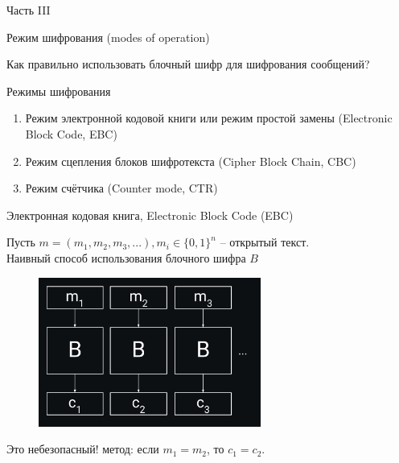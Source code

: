 \documentclass[usenames,dvipsnames,8pt,aspectratio=169]{beamer}
\begin{document}
\begin{frame}
Часть III \\ [10pt]
\begin{LARGE}
	
	\color{Orange}
	\Huge Режим шифрования (modes of operation)
	
\end{LARGE}
\end{frame}

\begin{frame}
\Huge
\centering
{\color{Orange}Как правильно использовать блочный шифр для шифрования сообщений?} \\[10pt]

\end{frame}

\begin{frame}{Режимы шифрования}
\LARGE
\centering
\begin{enumerate} 
\itemsep 10pt
\item Режим электронной кодовой книги или режим простой замены (Electronic Block Code, EBC)
\item Режим сцепления блоков шифротекста (Cipher Block Chain, CBC)
\item Режим счётчика (Counter mode, CTR)
\end{enumerate}

\end{frame}

\begin{frame}{Электронная кодовая книга, Electronic Block Code (EBC)}

\Large
Пусть $m = (m_1, m_2, m_3, ...), m_i \in \{0,1\}^n$ -- открытый текст. \\[10pt]
Наивный способ  использования блочного шифра $B$
\begin{figure}
\includegraphics[width=0.65\textwidth]{EBC}
\end{figure}
\LARGE
Это {\color{Orange} небезопасный!} метод: \quad
если $m_1 = m_2$, то $c_1 = c_2$.

\end{frame}
\end{document}
